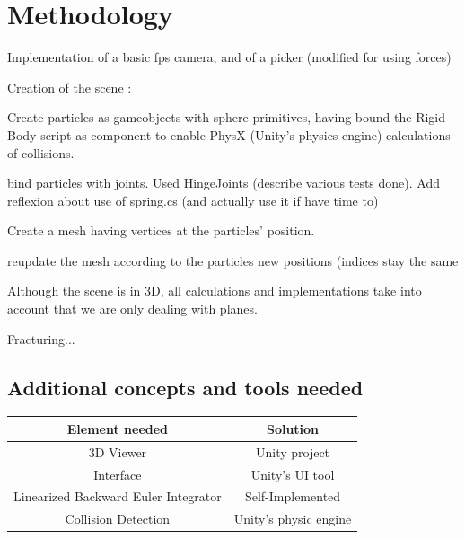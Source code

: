 \documentclass[tog]{acmsiggraph}
\begin{document}
\section{Methodology}
\begin{list}
\item Implementation of a basic fps camera, and of a picker (modified for using forces)
\item Creation of the scene : 
	\begin{list}
	\item Create particles as gameobjects with sphere primitives, having bound the Rigid Body script as component to enable PhysX (Unity's physics engine) calculations of collisions.
	\item bind particles with joints. Used HingeJoints (describe various tests done). Add reflexion about use of spring.cs (and actually use it if have time to)
	\item Create a mesh having vertices at the particles' position. 
	\item reupdate the mesh according to the particles new positions (indices stay the same
	\item Although the scene is in 3D, all calculations and implementations take into account that we are only dealing with planes.  
	\end{list}
\item Fracturing...

\end{list}


\subsection{Additional concepts and tools needed}

\begin{tabular}{|c|c|}
\hline
Element needed & Solution\\
\hline
\hline
3D Viewer & Unity project\\
Interface & Unity's UI tool \\
Linearized Backward Euler Integrator & Self-Implemented\\
Collision Detection & Unity's physic engine\\
\hline
\end{tabular}


\end{document}
